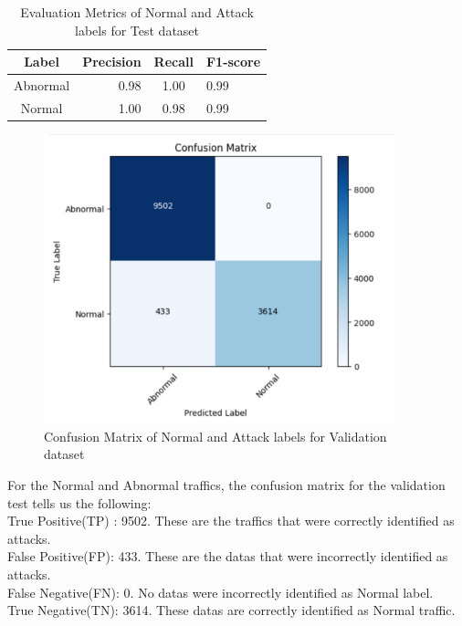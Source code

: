 \begin{table}[tbh]
	\centering
	\begin{tabular}{|c|r|c|l|} %
		\hline %
		Label  &Precision &Recall &F1-score \\
		\hline %
		Abnormal &0.98 &1.00 &0.99 \\
		\hline %
		Normal &1.00 &0.98 &0.99\\
		\hline
	\end{tabular}
	\caption{Evaluation Metrics of Normal and Attack labels for Test dataset}
	\label{Evaluation Metrics of Normal and Attack labels for test dataset}
\end{table}
 \begin{figure}[tbh] %
 	\begin{center}
 		\includegraphics[width=4in]{images/confMatnormvatt.png} 
 		\caption{Confusion Matrix of Normal and Attack labels for Validation dataset} %
 		\label{Confusion Matrix of Normal and Attack labels for Validation dataset} 
 	\end{center}
 \end{figure}
For the Normal and Abnormal traffics, the confusion matrix for the validation test tells us the following:\\ 
True Positive(TP) : 9502. These are the traffics that were correctly identified as attacks.\\
False Positive(FP): 433. These are the datas that were incorrectly identified as attacks.\\
False Negative(FN): 0. No datas were incorrectly identified as Normal label.\\
True Negative(TN): 3614. These datas are correctly identified as Normal traffic.\\

